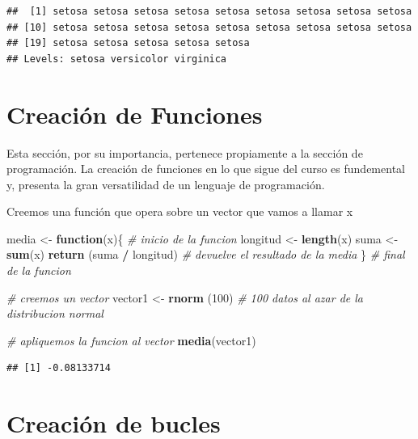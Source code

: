 \documentclass[
]{book}
\newenvironment{Shaded}{\begin{snugshade}}{\end{snugshade}}
\newcommand{\CommentTok}[1]{\textcolor[rgb]{0.56,0.35,0.01}{\textit{#1}}}
\newcommand{\ControlFlowTok}[1]{\textcolor[rgb]{0.13,0.29,0.53}{\textbf{#1}}}
\newcommand{\DecValTok}[1]{\textcolor[rgb]{0.00,0.00,0.81}{#1}}
\newcommand{\KeywordTok}[1]{\textcolor[rgb]{0.13,0.29,0.53}{\textbf{#1}}}
\newcommand{\NormalTok}[1]{#1}
\newcommand{\OperatorTok}[1]{\textcolor[rgb]{0.81,0.36,0.00}{\textbf{#1}}}
\newcommand{\StringTok}[1]{\textcolor[rgb]{0.31,0.60,0.02}{#1}}
\begin{document}
\begin{verbatim}
##  [1] setosa setosa setosa setosa setosa setosa setosa setosa setosa
## [10] setosa setosa setosa setosa setosa setosa setosa setosa setosa
## [19] setosa setosa setosa setosa setosa
## Levels: setosa versicolor virginica
\end{verbatim}

\hypertarget{creaciuxf3n-de-funciones}{%
\chapter{Creación de Funciones}\label{creaciuxf3n-de-funciones}}

Esta sección, por su importancia, pertenece propiamente a la sección de programación. La creación de funciones en lo que sigue del curso es fundemental y, presenta la gran versatilidad de un lenguaje de programación.

Creemos una función que opera sobre un vector que vamos a llamar x

\begin{Shaded}
\begin{Highlighting}[]
\NormalTok{media <-}\StringTok{ }\ControlFlowTok{function}\NormalTok{(x)\{     }\CommentTok{# inicio de la funcion}
\NormalTok{ longitud <-}\StringTok{ }\KeywordTok{length}\NormalTok{(x)}
\NormalTok{ suma <-}\StringTok{ }\KeywordTok{sum}\NormalTok{(x)}
 \KeywordTok{return}\NormalTok{ (suma }\OperatorTok{/}\StringTok{ }\NormalTok{longitud) }\CommentTok{# devuelve el resultado de la media}
\NormalTok{\}                         }\CommentTok{# final de la funcion}


\CommentTok{# creemos un vector}
\NormalTok{vector1 <-}\StringTok{ }\KeywordTok{rnorm}\NormalTok{ (}\DecValTok{100}\NormalTok{) }\CommentTok{# 100 datos al azar de la distribucion normal}

\CommentTok{# apliquemos la funcion al vector}
\KeywordTok{media}\NormalTok{(vector1)}
\end{Highlighting}
\end{Shaded}

\begin{verbatim}
## [1] -0.08133714
\end{verbatim}

\hypertarget{creaciuxf3n-de-bucles}{%
\chapter{Creación de bucles}\label{creaciuxf3n-de-bucles}}
\end{document}
